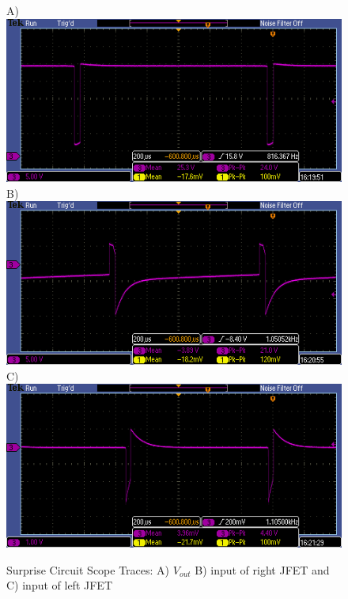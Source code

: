 \documentclass{article}
\begin{document}
    \begin{figure}[H]
        \centering
        
            A) \includegraphics[scale = 0.5]{TEK00004.PNG}\\
            B) \includegraphics[scale = 0.5]{TEK00005.PNG}\\
            C) \includegraphics[scale = 0.5]{tek00006.PNG}
        
        \caption{Surprise Circuit Scope Traces: A) $V_{out}$ B) input of right JFET and C) input of left JFET}
        \label{fig:my_label}
    \end{figure}
\end{document}
